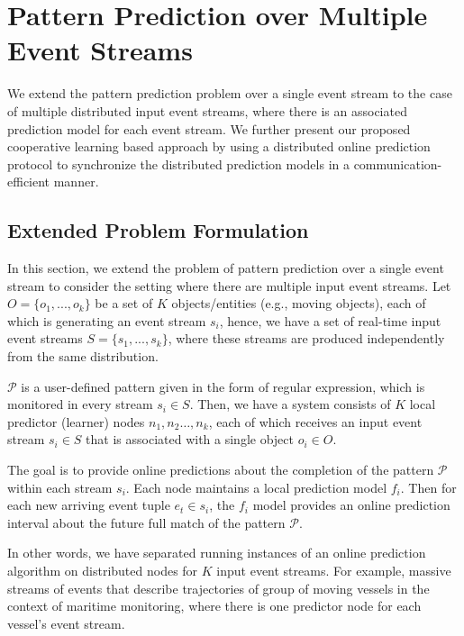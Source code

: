 \section{Pattern Prediction over Multiple Event Streams}

We extend the pattern prediction problem over a single event stream to the case of multiple distributed input event streams, where there is an associated prediction model for each event stream. We further present our proposed cooperative learning based approach by using a distributed online prediction protocol \cite{kamp2014communication} to synchronize the distributed prediction models in a communication-efficient manner. 


\subsection{Extended Problem Formulation}

\par In this section, we extend the problem of pattern prediction over a single event stream to consider the setting where there are multiple input event streams. Let $O = \{ o_1, ..., o_k\}$ be a set of \emph{$K$} objects/entities (e.g., moving objects), each of which is generating an event stream $s_i$, hence, we have a set of real-time input event streams $S = \{ s_1, ..., s_k\}$, where these streams are produced independently from the same distribution.


 \par $\mathcal{P}$ is a user-defined pattern given in the form of regular expression, which is monitored in every stream $s_i \in S$. Then, we have a system consists of \emph{$K$} local predictor (learner) nodes $n_1,n_2\dots,n_k$, each of which receives an input event stream $s_i\in S$ that is associated with a single object $o_i \in O$.

\par  The goal is to provide online predictions about the completion of the pattern $\mathcal{P}$ within each stream $s_i$. Each node maintains a local prediction model $f_i$. Then for each new arriving event tuple  $e_t \in s_i$, the $f_i$ model provides an online prediction interval about the future full match of the pattern $\mathcal{P}$.

\par In other words, we have separated running instances of an online prediction algorithm on distributed nodes for \emph{$K$} input event streams. For example, massive streams of events that describe trajectories of group of moving vessels in the context of maritime monitoring, where there is one predictor node for each vessel's event stream.
  
